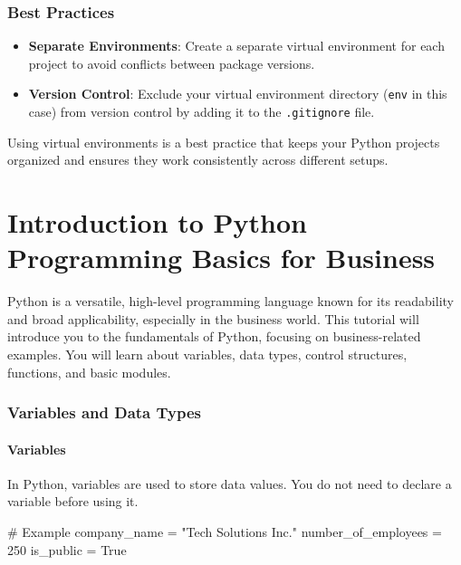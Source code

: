 \documentclass[
  letterpaper,
  DIV=11,
  numbers=noendperiod]{scrreprt}
\newenvironment{Shaded}{\begin{snugshade}}{\end{snugshade}}
\newcommand{\CommentTok}[1]{\textcolor[rgb]{0.37,0.37,0.37}{#1}}
\newcommand{\DecValTok}[1]{\textcolor[rgb]{0.68,0.00,0.00}{#1}}
\newcommand{\NormalTok}[1]{\textcolor[rgb]{0.00,0.23,0.31}{#1}}
\newcommand{\OperatorTok}[1]{\textcolor[rgb]{0.37,0.37,0.37}{#1}}
\newcommand{\StringTok}[1]{\textcolor[rgb]{0.13,0.47,0.30}{#1}}
\newcommand{\VariableTok}[1]{\textcolor[rgb]{0.07,0.07,0.07}{#1}}
\providecommand{\tightlist}{%
  \setlength{\itemsep}{0pt}\setlength{\parskip}{0pt}}\usepackage{longtable,booktabs,array}
\begin{document}
\subsection{Best Practices}\label{best-practices}

\begin{itemize}
\tightlist
\item
  \textbf{Separate Environments}: Create a separate virtual environment
  for each project to avoid conflicts between package versions.
\item
  \textbf{Version Control}: Exclude your virtual environment directory
  (\texttt{env} in this case) from version control by adding it to the
  \texttt{.gitignore} file.
\end{itemize}

Using virtual environments is a best practice that keeps your Python
projects organized and ensures they work consistently across different
setups.


\chapter{Introduction to Python Programming Basics for
Business}\label{introduction-to-python-programming-basics-for-business}

Python is a versatile, high-level programming language known for its
readability and broad applicability, especially in the business world.
This tutorial will introduce you to the fundamentals of Python, focusing
on business-related examples. You will learn about variables, data
types, control structures, functions, and basic modules.

\subsection{Variables and Data Types}\label{variables-and-data-types}

\subsubsection{Variables}\label{variables}

In Python, variables are used to store data values. You do not need to
declare a variable before using it.

\begin{Shaded}
\begin{Highlighting}[]
\CommentTok{\# Example}
\NormalTok{company\_name }\OperatorTok{=} \StringTok{"Tech Solutions Inc."}
\NormalTok{number\_of\_employees }\OperatorTok{=} \DecValTok{250}
\NormalTok{is\_public }\OperatorTok{=} \VariableTok{True}
\end{Highlighting}
\end{Shaded}
\end{document}
